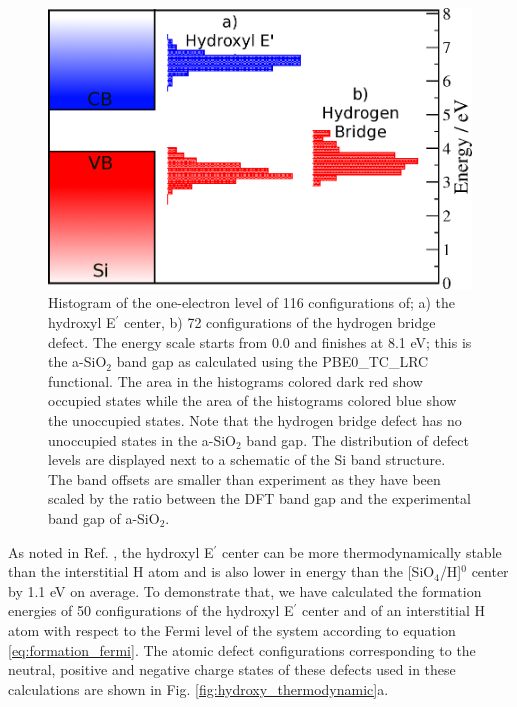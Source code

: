 \documentclass[aps,prb,reprint,superscriptaddress,showpacs]{revtex4-1}
\begin{document}
\begin{figure}[h!]
\includegraphics{hdefects_sisio2.png}
\caption{Histogram of the one-electron level of 116 configurations of; a) the hydroxyl E$^\prime$ center, b) 72 configurations of the hydrogen bridge defect. The energy scale starts from 0.0 and finishes at 8.1 eV; this is the a-SiO$_2$ band gap as calculated using the PBE0\_TC\_LRC functional. The area in the histograms colored dark red show occupied states while the area of the histograms colored blue show the unoccupied states. Note that the hydrogen bridge defect has no unoccupied states in the a-SiO$_2$ band gap. The distribution of defect levels are displayed next to a schematic of the Si band structure. The band offsets are smaller than experiment as they have been scaled by the ratio between the DFT band gap and the experimental band gap of a-SiO$_2$.} 
\label{fig:sio2_h_dos}
\end{figure}

As noted in Ref. \cite{aelsayed_prl}, the hydroxyl E$^\prime$ center can be more thermodynamically stable than the interstitial H atom and is also lower in energy than the [SiO$_4$/H]$^0$ center by 1.1 eV on average. To demonstrate that, we have calculated the formation energies of 50 configurations of the hydroxyl E$^\prime$ center and of an interstitial H atom with respect to the Fermi level of the system according to equation \ref{eq:formation_fermi}. The atomic defect configurations corresponding to the neutral, positive and negative charge states of these defects used in these calculations are shown in Fig. \ref{fig:hydroxy_thermodynamic}a. 
\end{document}
